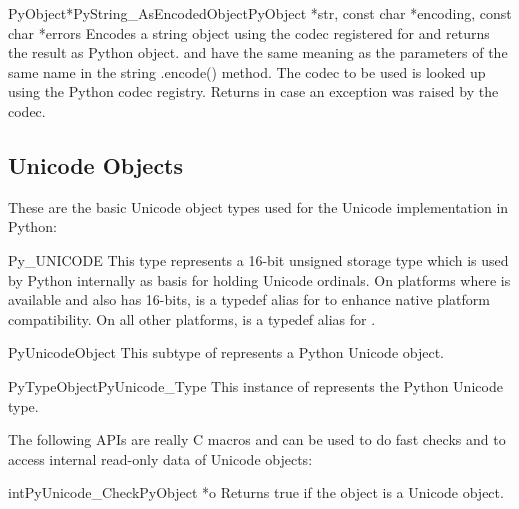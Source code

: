 \documentclass{manual}
\begin{document}
\begin{cfuncdesc}{PyObject*}{PyString_AsEncodedObject}{PyObject *str,
                                               const char *encoding,
                                               const char *errors}
Encodes a string object using the codec registered
for  and returns the result as Python 
object.  and  have the same meaning as the
parameters of the same name in the string .encode() method. The codec
to be used is looked up using the Python codec registry. Returns
\NULL{} in case an exception was raised by the codec.
\end{cfuncdesc}


\subsection{Unicode Objects \label{unicodeObjects}}


These are the basic Unicode object types used for the Unicode
implementation in Python:

\begin{ctypedesc}{Py_UNICODE}
This type represents a 16-bit unsigned storage type which is used by
Python internally as basis for holding Unicode ordinals. On platforms
where  is available and also has 16-bits,
 is a typedef alias for  to enhance
native platform compatibility. On all other platforms,
 is a typedef alias for .
\end{ctypedesc}

\begin{ctypedesc}{PyUnicodeObject}
This subtype of  represents a Python Unicode object.
\end{ctypedesc}

\begin{cvardesc}{PyTypeObject}{PyUnicode_Type}
This instance of  represents the Python Unicode type.
\end{cvardesc}


The following APIs are really C macros and can be used to do fast
checks and to access internal read-only data of Unicode objects:

\begin{cfuncdesc}{int}{PyUnicode_Check}{PyObject *o}
Returns true if the object  is a Unicode object.
\end{cfuncdesc}
\end{document}
